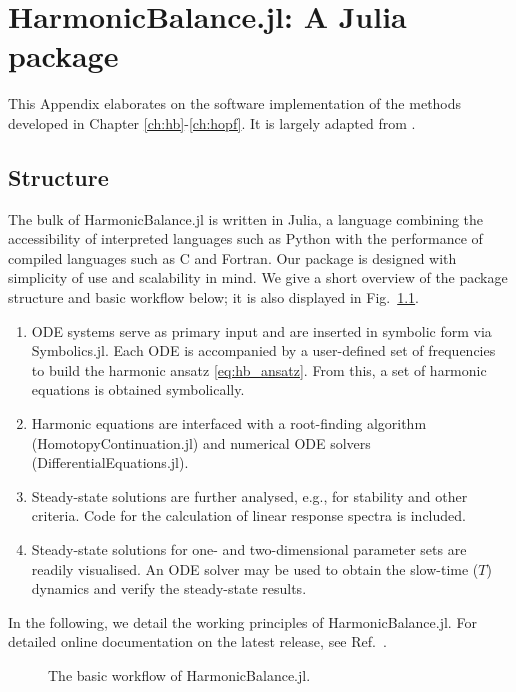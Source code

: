 	
\chapter{HarmonicBalance.jl: A Julia package} \label{app:hb}
	
This Appendix elaborates on the software implementation of the methods developed in Chapter \ref{ch:hb}-\ref{ch:hopf}. It is largely adapted from \cite{Kosata_2022a}.
	
\section{Structure}

The bulk of HarmonicBalance.jl is written in Julia, a language combining the accessibility of interpreted languages such as Python with the performance of compiled languages such as C and Fortran. Our package is designed with simplicity of use and scalability in mind. We give a short overview of the package structure and basic workflow below; it is also displayed in Fig.~\ref{fig:app_workflow}.
\begin{enumerate}
	\item ODE systems serve as primary input and are inserted in symbolic form via Symbolics.jl. Each ODE is accompanied by a user-defined set of frequencies to build the harmonic ansatz \eqref{eq:hb_ansatz}. From this, a set of harmonic equations is obtained symbolically.
	\item Harmonic equations are interfaced with a root-finding algorithm (HomotopyContinuation.jl) and numerical ODE solvers (DifferentialEquations.jl).
	\item  Steady-state solutions are further analysed, e.g., for stability and other criteria. Code for the calculation of linear response spectra is included. 
	\item Steady-state solutions for one- and two-dimensional parameter sets are readily visualised. An ODE solver may be used to obtain the slow-time ($T$) dynamics and verify the steady-state results.
\end{enumerate}

In the following, we detail the working principles of HarmonicBalance.jl. For detailed online documentation on the latest release, see Ref.~\cite{harmonic_balance_docs}.

\begin{figure} [h!]
	\centering
	
	\caption{The basic workflow of HarmonicBalance.jl.}
	\label{fig:app_workflow}
\end{figure}

